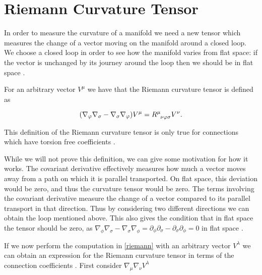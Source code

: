\section{Riemann Curvature Tensor}

In order to measure the curvature of a manifold we need a new tensor which measures the change of a vector moving on the manifold around a closed loop. We choose a closed loop in order to see how the manifold varies from flat space: if the vector is unchanged by its journey around the loop then we should be in flat space \cite{cheng, carroll}.

For an arbitrary vector \(V^{\mu}\) we have that the Riemann curvature tensor is defined as \cite{carroll}

\begin{equation} \label{riemann}
	(\nabla_{\phi} \nabla_{\sigma} - \nabla_{\sigma} \nabla_{\phi}) V^{\mu} = R\indices{^\mu_\nu_\phi_\sigma} V^{\nu} .
\end{equation}

This definition of the Riemann curvature tensor is only true for connections which have torsion free coefficients \cite{lovelock}.

While we will not prove this definition, we can give some motivation for how it works. The covariant derivative effectively measures how much a vector moves away from a path on which it is parallel transported. On flat space, this deviation would be zero, and thus the curvature tensor would be zero. The terms involving the covariant derivative measure the change of a vector compared to its parallel transport in that direction. Thus by considering two different directions we can obtain the loop mentioned above. This also gives the condition that in flat space the tensor should be zero, as \(\nabla_{\phi} \nabla_{\sigma} - \nabla_{\sigma} \nabla_{\phi} = \partial_{\phi} \partial_{\sigma} - \partial_{\sigma} \partial_{\phi} = 0\) in flat space \cite{cheng, carroll, woodhouse}.

If we now perform the computation in \eqref{riemann} with an arbitrary vector \(V^{\lambda}\) we can obtain an expression for the Riemann curvature tensor in terms of the connection coefficients \cite{carroll, woodhouse}. First consider \(\nabla_{\mu} \nabla_{\nu} V^{\lambda}\)

